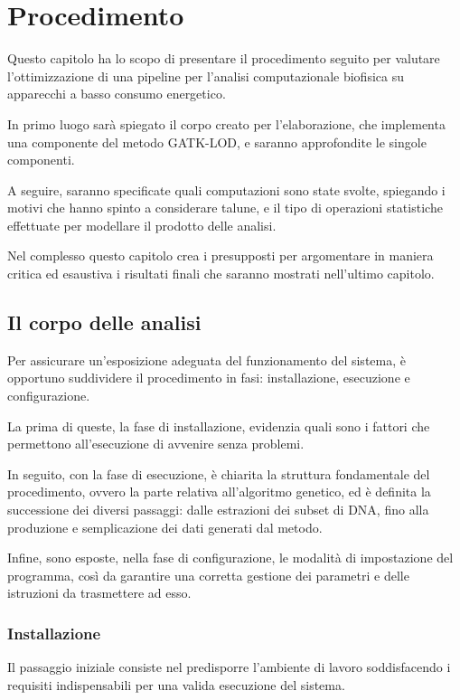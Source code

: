 \chapter{Procedimento}
Questo capitolo ha lo scopo di presentare il procedimento seguito per valutare l'ottimizzazione di una pipeline per l'analisi computazionale biofisica su apparecchi a basso consumo energetico.


In primo luogo sarà spiegato il corpo creato per l'elaborazione, che implementa una componente del metodo GATK-LOD, e saranno approfondite le singole componenti.

A seguire, saranno specificate quali computazioni sono state svolte, spiegando i motivi che hanno spinto a considerare talune, e il tipo di operazioni statistiche effettuate per modellare il prodotto delle analisi.


Nel complesso questo capitolo crea i presupposti per argomentare in maniera critica ed esaustiva i risultati finali che saranno mostrati nell'ultimo capitolo.



\section{Il corpo delle analisi}
Per assicurare un'esposizione adeguata del funzionamento del sistema, è opportuno suddividere il procedimento in fasi: installazione, esecuzione e configurazione.


La prima di queste, la fase di installazione, evidenzia quali sono i fattori che permettono all'esecuzione di avvenire senza problemi.


In seguito, con la fase di esecuzione, è chiarita la struttura fondamentale del procedimento, ovvero la parte relativa all'algoritmo genetico, ed è definita la successione dei diversi passaggi: dalle estrazioni dei subset di DNA, fino alla produzione e semplicazione dei dati generati dal metodo.


Infine, sono esposte, nella fase di configurazione, le modalità di impostazione del programma, così da garantire una corretta gestione dei parametri e delle istruzioni da trasmettere ad esso.


\subsection{Installazione}
Il passaggio iniziale consiste nel predisporre l'ambiente di lavoro soddisfacendo i requisiti indispensabili per una valida esecuzione del sistema.


